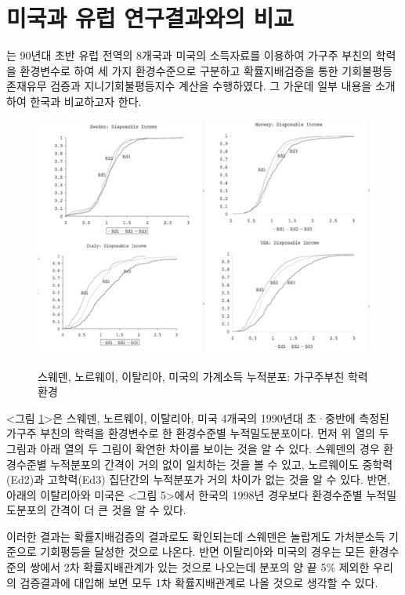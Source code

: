 \section{미국과 유럽 연구결과와의 비교}

\citet{letl08}는 90년대 초반 유럽 전역의 8개국과 미국의 소득자료를 이용하여 가구주 부친의 학력을 환경변수로 하여 세 가지 환경수준으로 구분하고 확률지배검증을 통한 기회불평등 존재유무 검증과 지니기회불평등지수 계산을 수행하였다.
 그 가운데 일부 내용을 소개하여 한국과 비교하고자 한다.
 
\begin{figure}
    \centering
    \caption{스웨덴, 노르웨이, 이탈리아, 미국의 가계소득 누적분포: 가구주부친 학력환경}
    \includegraphics[width=\textwidth]{figure/letl08.png}
    \label{fig:letl08}
\end{figure}

<그림 \ref{fig:letl08}>은 스웨덴, 노르웨이, 이탈리아, 미국 4개국의 1990년대 초·중반에 측정된 가구주 부친의 학력을 환경변수로 한 환경수준별 누적밀도분포이다.
 먼저 위 열의 두 그림과 아래 열의 두 그림이 확연한 차이를 보이는 것을 알 수 있다.
 스웨덴의 경우 환경수준별 누적분포의 간격이 거의 없이 일치하는 것을 볼 수 있고, 노르웨이도 중학력(Ed2)과 고학력(Ed3) 집단간의 누적분포가 거의 차이가 없는 것을 알 수 있다.
 반면, 아래의 이탈리아와 미국은 <그림 5>에서 한국의 1998년 경우보다 환경수준별 누적밀도분포의 간격이 더 큰 것을 알 수 있다.

이러한 결과는 확률지배검증의 결과로도 확인되는데 스웨덴은 놀랍게도 가처분소득 기준으로 기회평등을 달성한 것으로 나온다.
 반면 이탈리아와 미국의 경우는 모든 환경수준의 쌍에서 2차 확률지배관계가 있는 것으로 나오는데 분포의 양 끝 5\% 제외한 우리의 검증결과에 대입해 보면 모두 1차 확률지배관계로 나올 것으로 생각할 수 있다.
 
